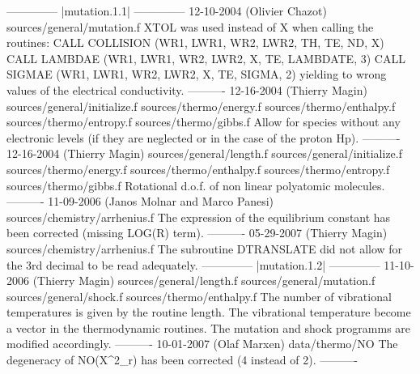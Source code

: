 --------------
|mutation.1.1|
--------------
12-10-2004 (Olivier Chazot)
sources/general/mutation.f
XTOL was used instead of X when calling the routines:
  CALL COLLISION (WR1, LWR1, WR2, LWR2, TH, TE, ND, X)
  CALL LAMBDAE (WR1, LWR1, WR2, LWR2, X, TE, LAMBDATE, 3)
  CALL SIGMAE (WR1, LWR1, WR2, LWR2, X, TE, SIGMA, 2)
yielding to wrong values of the electrical conductivity.
----------
12-16-2004 (Thierry Magin)
sources/general/initialize.f
sources/thermo/energy.f
sources/thermo/enthalpy.f
sources/thermo/entropy.f 
sources/thermo/gibbs.f
Allow for species without any electronic levels (if they are 
neglected or in the case of the proton Hp). 
----------
12-16-2004 (Thierry Magin) 
sources/general/length.f
sources/general/initialize.f
sources/thermo/energy.f
sources/thermo/enthalpy.f
sources/thermo/entropy.f 
sources/thermo/gibbs.f
Rotational d.o.f. of non linear polyatomic molecules.
----------
11-09-2006 (Janos Molnar and Marco Panesi)
sources/chemistry/arrhenius.f
The expression of the equilibrium constant has been corrected 
(missing LOG(R) term).
----------
05-29-2007 (Thierry Magin)
sources/chemistry/arrhenius.f
The subroutine DTRANSLATE did not allow for the 3rd decimal to be
read adequately.
--------------
|mutation.1.2|
--------------
11-10-2006 (Thierry Magin)
sources/general/length.f
sources/general/mutation.f
sources/general/shock.f
sources/thermo/enthalpy.f
The number of vibrational temperatures is given by the routine length.
The vibrational temperature become  a vector in the thermodynamic 
routines. The mutation and shock programms are modified accordingly.
----------
10-01-2007 (Olaf Marxen)
data/thermo/NO
The degeneracy of NO(X^2\Pi_r) has been corrected (4 instead of
2).
----------
